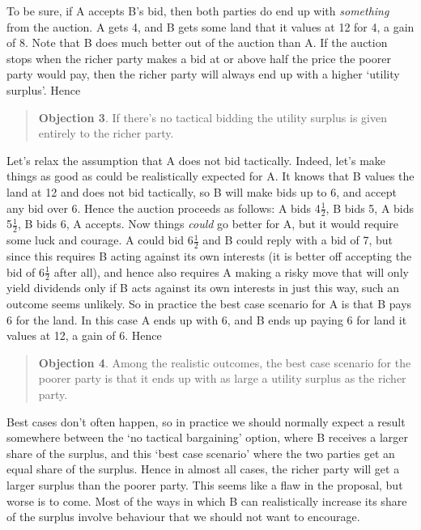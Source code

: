 To be sure, if A accepts B's bid, then both parties do end up with \textit{something} from the auction. A gets 4, and B gets some land that it values at 12 for 4, a gain of 8. Note that B does much better out of the auction than A. If the auction stops when the richer party makes a bid at or above half the price the poorer party would pay, then the richer party will always end up with a higher `utility surplus'. Hence 

\begin{quote}
\textbf{Objection 3}. If there's no tactical bidding the utility surplus is given entirely to the richer party.
\end{quote}

\noindent Let's relax the assumption that A does not bid tactically. Indeed, let's make things as good as could be realistically expected for A. It knows that B values the land at 12 and does not bid tactically, so B will make bids up to 6, and accept any bid over 6. Hence the auction proceeds as follows: A bids 4\(\frac{1}{2}\), B bids 5, A bids 5\(\frac{1}{2}\), B bids 6, A accepts. Now things \textit{could} go better for A, but it would require some luck and courage. A could bid 6\(\frac{1}{2}\) and B could reply with a bid of 7, but since this requires B acting against its own interests (it is better off accepting the bid of 6\(\frac{1}{2}\) after all), and hence also requires A making a risky move that will only yield dividends only if B acts against its own interests in just this way, such an outcome seems unlikely. So in practice the best case scenario for A is that B pays 6 for the land. In this case A ends up with 6, and B ends up paying 6 for land it values at 12, a gain of 6. Hence

\begin{quote}
\textbf{Objection 4}. Among the realistic outcomes, the best case scenario for the poorer party is that it ends up with as large a utility surplus as the richer party.
\end{quote}

\noindent Best cases don't often happen, so in practice we should normally expect a result somewhere between the `no tactical bargaining' option, where B receives a larger share of the surplus, and this `best case scenario' where the two parties get an equal share of the surplus. Hence in almost all cases, the richer party will get a larger surplus than the poorer party. This seems like a flaw in the proposal, but worse is to come. Most of the ways in which B can realistically increase its share of the surplus involve behaviour that we should not want to encourage.

